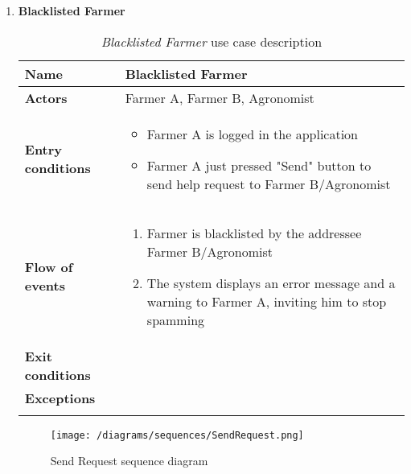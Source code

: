 \begin{enumerate}
	        \item \textbf{Blacklisted Farmer}
	        	\begin{longtable}{p{0.26\linewidth}p{0.75\linewidth}}
	        		\toprule
	        		\textbf{Name} & \textbf{Blacklisted Farmer} \\
	        		\midrule
	        		\textbf{Actors} & Farmer A, Farmer B, Agronomist \\
	        		\midrule
	        		\textbf{Entry conditions} & \begin{itemize}
	        										\item Farmer A is logged in the application
	        										\item Farmer A just pressed "Send" button to send help request to Farmer B/Agronomist
        										\end{itemize} \\
	        		\midrule
	        		\textbf{Flow of events} & 
	        		\begin{enumerate}
	        			\item Farmer is blacklisted by the addressee Farmer B/Agronomist
	        			\item The system displays an error message and a warning to Farmer A, inviting him to stop spamming
	        		\end{enumerate} \\
		        	\midrule
		        	\textbf{Exit conditions} & \\
		        	\midrule
		        	\textbf{Exceptions} &  \\
	        		\bottomrule
	        		\caption{\emph{Blacklisted Farmer} use case description}
	        	\end{longtable}
    	   
		
		\begin{figure}[h!]
			\centering
			\texttt{[image: /diagrams/sequences/SendRequest.png]}
			\caption{Send Request sequence diagram}
		\end{figure}
			
		\FloatBarrier
		\newpage
		

\end{enumerate}
